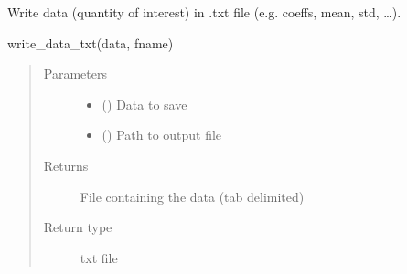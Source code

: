 \documentclass[letterpaper,10pt,english,openany,oneside]{sphinxmanual}
\begin{document}
\begin{fulllineitems}
\label{\detokenize{pygpc:pygpc.io.write_data_txt}}
Write data (quantity of interest) in .txt file (e.g. coeffs, mean, std, …).

write\_data\_txt(data, fname)
\begin{quote}\begin{description}
\item[{Parameters}] \leavevmode\begin{itemize}
\item {} 
 () \textendash{} Data to save

\item {} 
 () \textendash{} Path to output file

\end{itemize}

\item[{Returns}] \leavevmode
{} \textendash{} File containing the data (tab delimited)

\item[{Return type}] \leavevmode
txt file

\end{description}\end{quote}

\end{fulllineitems}

\end{document}
